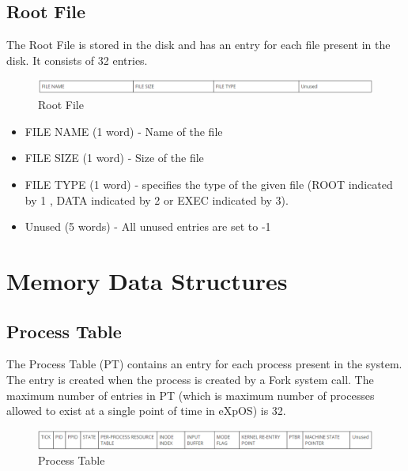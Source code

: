 \subsection{Root File}

The Root File is stored in the disk and has an entry for each file present in the disk. It consists of 32 entries.

\begin{figure}[ht]
\centering
\includegraphics  [scale=0.55]{figures/ROOT.png}
\caption{\footnotesize Root File}
\end{figure}

\begin{itemize}

\item FILE NAME (1 word) - Name of the file
\item FILE SIZE (1 word) - Size of the file
\item FILE TYPE (1 word) - specifies the type of the given file (ROOT indicated by 1 , DATA indicated by 2 or EXEC indicated by 3).
\item Unused (5 words) - All unused entries are set to -1
\end{itemize}

\section {Memory Data Structures}

\subsection {Process Table}

The Process Table (PT) contains an entry for each process present in the system. The entry is created when the process is created by a Fork system call. The maximum number of entries in PT (which is maximum number of processes allowed to exist at a single point of time in eXpOS) is 32.

\begin{figure}[ht]
\centering
\includegraphics  [scale=0.55]{figures/pt.png}
\caption{\footnotesize Process Table}
\end{figure}

